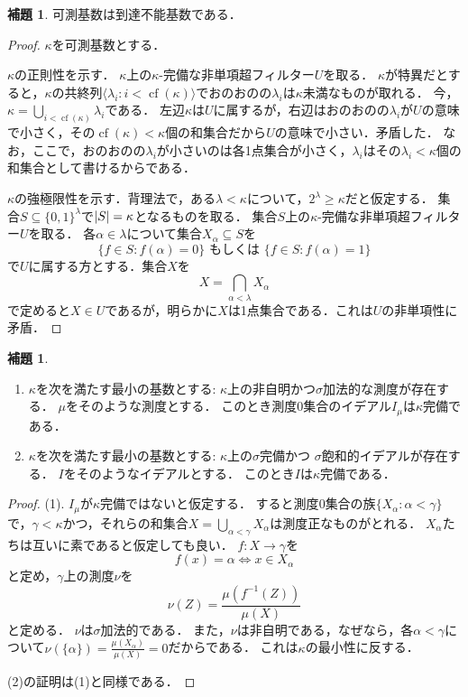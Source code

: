 \documentclass[uplatex]{jsarticle}
\newcommand{\cf}{\operatorname{cf}}
\newcommand{\seq}[1]{{\langle#1\rangle}}
\DeclarePairedDelimiter\abs{\lvert}{\rvert}
\renewcommand\subset{\subseteq}
\theoremstyle{definition}
\newtheorem{lem}[thm]{補題}
\begin{document}
	\begin{lem}\label{lem:measisinacc}
	可測基数は到達不能基数である．
	\end{lem}
	\begin{proof}
		$\kappa$を可測基数とする．
		
		$\kappa$の正則性を示す．
		$\kappa$上の$\kappa$-完備な非単項超フィルター$U$を取る．
		$\kappa$が特異だとすると，$\kappa$の共終列$\seq{\lambda_i : i < \cf(\kappa) }$でおのおのの$\lambda_i$は$\kappa$未満なものが取れる．
		今，$\kappa = \bigcup_{i < \cf(\kappa)} \lambda_i$である．
		左辺$\kappa$は$U$に属するが，右辺はおのおのの$\lambda_i$が$U$の意味で小さく，その$\cf(\kappa) < \kappa$個の和集合だから$U$の意味で小さい．矛盾した．
		なお，ここで，おのおのの$\lambda_i$が小さいのは各1点集合が小さく，$\lambda_i$はその$\lambda_i < \kappa$個の和集合として書けるからである．
		
		$\kappa$の強極限性を示す．背理法で，ある$\lambda < \kappa$について，$2^\lambda \ge \kappa$だと仮定する．
		集合$S \subset \{0, 1\}^\lambda$で$\abs{S} = \kappa$となるものを取る．
		集合$S$上の$\kappa$-完備な非単項超フィルター$U$を取る．
		各$\alpha \in \lambda$について集合$X_\alpha \subset S$を
		\[
		\{ f \in S : f(\alpha) = 0 \} \text{ もしくは } \{ f \in S : f(\alpha) = 1 \}
		\]
		で$U$に属する方とする．集合$X$を
		\[
		X = \bigcap_{\alpha < \lambda} X_\alpha
		\]
		で定めると$X \in U$であるが，明らかに$X$は1点集合である．これは$U$の非単項性に矛盾．
	\end{proof}

	\begin{lem}
		\begin{enumerate}
			\item $\kappa$を次を満たす最小の基数とする: $\kappa$上の非自明かつ$\sigma$加法的な測度が存在する．
			$\mu$をそのような測度とする．
			このとき測度$0$集合のイデアル$I_\mu$は$\kappa$完備である．
			\item $\kappa$を次を満たす最小の基数とする: $\kappa$上の$\sigma$完備かつ $\sigma$飽和的イデアルが存在する．
			$I$をそのようなイデアルとする．
			このとき$I$は$\kappa$完備である．
		\end{enumerate}
	\end{lem}
	\begin{proof}
		(1). $I_\mu$が$\kappa$完備ではないと仮定する．
		すると測度$0$集合の族$\{X_\alpha : \alpha < \gamma \}$で，$\gamma < \kappa$かつ，それらの和集合$X = \bigcup_{\alpha < \gamma} X_\alpha$は測度正なものがとれる．
		$X_\alpha$たちは互いに素であると仮定しても良い．
		$f \colon X \to \gamma$を
		\[
		f(x) = \alpha \iff x \in X_\alpha
		\]
		と定め，$\gamma$上の測度$\nu$を
		\[
			\nu(Z) = \frac{\mu(f^{-1}(Z))}{\mu(X)} 
		\]
		と定める．
		$\nu$は$\sigma$加法的である．
		また，$\nu$は非自明である，なぜなら，各$\alpha < \gamma$について$\nu(\{\alpha\}) = \frac{\mu(X_\alpha)}{\mu(X)} = 0$だからである．
		これは$\kappa$の最小性に反する．
		
		(2)の証明は(1)と同様である．
	\end{proof}
\end{document}
